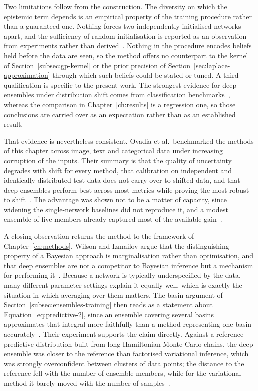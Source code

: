 Two limitations follow from the construction. The diversity on which the
epistemic term depends is an empirical property of the training procedure rather
than a guaranteed one. Nothing forces two independently initialised networks
apart, and the sufficiency of random initialisation is reported as an
observation from experiments rather than derived~\cite{lakshminarayanan2017}.
Nothing in the procedure encodes beliefs held before the
data are seen, so the method offers no counterpart to the kernel of
Section~\ref{subsec:gp-kernel} or the prior precision of
Section~\ref{sec:laplace-approximation} through which such beliefs could be
stated or tuned. A third qualification is specific to the present work. The
strongest evidence for deep ensembles under distribution shift comes from
classification benchmarks~\cite{ovadia2019, wilson2020}, whereas the comparison
in Chapter~\ref{ch:results} is a regression one, so those conclusions are
carried over as an expectation rather than as an established result.

That evidence is nevertheless consistent. Ovadia et al.\ benchmarked the
methods of this chapter across image, text and categorical data under
increasing corruption of the inputs. Their summary is that the quality of
uncertainty degrades with shift for every method, that calibration on
independent and identically distributed test data does not carry over to
shifted data, and that deep ensembles perform best across most metrics while
proving the most robust to shift~\cite{ovadia2019}. The advantage was shown not
to be a matter of capacity, since widening the single-network baselines did not
reproduce it, and a modest ensemble of five members already captured most of the
available gain~\cite{ovadia2019}.

A closing observation returns the method to the framework of
Chapter~\ref{ch:methods}. Wilson and Izmailov argue that the distinguishing
property of a Bayesian approach is marginalisation rather than optimisation, and
that deep ensembles are not a competitor to Bayesian inference but a mechanism
for performing it~\cite{wilson2020}. Because a network is typically
underspecified by the data, many different parameter settings explain it
equally well, which is exactly the situation in which averaging over them
matters. The basin argument of Section~\ref{subsec:ensembles-training} then
reads as a statement about Equation~\eqref{eq:predictive-2}, since an ensemble
covering several basins approximates that integral more faithfully than a method
representing one basin accurately~\cite{wilson2020}. Their experiment supports
the claim directly. Against a reference predictive distribution built from long
Hamiltonian Monte Carlo chains, the deep ensemble was closer to the reference
than factorised variational inference, which was strongly overconfident between
clusters of data points; the distance to the reference fell with the number of
ensemble members, while for the variational method it barely moved with the
number of samples~\cite{wilson2020}.

